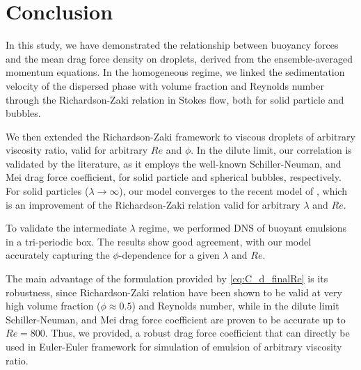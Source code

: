 \section{Conclusion}

In this study, we have demonstrated the relationship between buoyancy forces and the mean drag force density on droplets, derived from the ensemble-averaged momentum equations. 
In the homogeneous regime, we linked the sedimentation velocity of the dispersed phase with volume fraction and Reynolds number through the Richardson-Zaki relation in Stokes flow, both for solid particle and bubbles.

We then extended the Richardson-Zaki framework to viscous droplets of arbitrary viscosity ratio, valid for arbitrary $Re$ and $\phi$. 
In the dilute limit, our correlation is validated by the literature, as it employs the well-known Schiller-Neuman, and Mei drag force coefficient, for solid particle and spherical bubbles, respectively. 
For solid particles ($\lambda \to \infty$), our model converges to the recent model of \citet{kramer2019improvement}, which is an improvement of the Richardson-Zaki relation valid for arbitrary $\lambda$ and $Re$.

To validate the intermediate $\lambda$ regime, we performed DNS of buoyant emulsions in a tri-periodic box. 
The results show good agreement, with our model accurately capturing the $\phi$-dependence for a given $\lambda$ and $Re$.

The main advantage of the formulation provided by \ref{eq:C_d_finalRe} is its robustness, since Richardson-Zaki relation have been shown to be valid at very high volume fraction  ($\phi \approx 0.5$) and Reynolds number, while in the dilute limit Schiller-Neuman, and Mei drag force coefficient are proven to be accurate up to $Re = 800$. 
Thus, we provided, a robust drag force coefficient that can directly be used in Euler-Euler framework for simulation of emulsion of arbitrary viscosity ratio. 